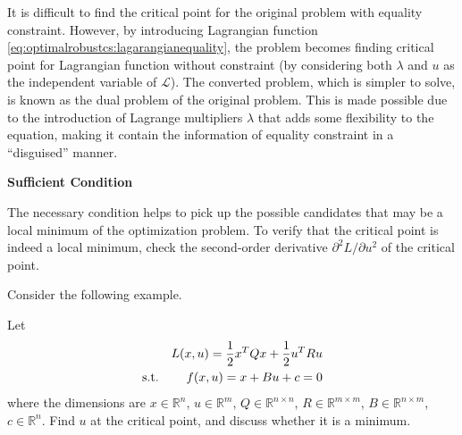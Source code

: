 It is difficult to find the critical point for the original problem with equality constraint. However, by introducing Lagrangian function \eqref{eq:optimalrobustcs:lagarangianequality}, the problem becomes finding critical point for Lagrangian function without constraint (by considering both $\lambda$ and $u$ as the independent variable of $\mathcal{L}$). The converted problem, which is simpler to solve, is known as the dual problem of the original problem. This is made possible due to the introduction of Lagrange multipliers $\lambda$ that adds some flexibility to the equation, making it contain the information of equality constraint in a ``disguised'' manner.

\vspace{0.1in}
\noindent \textbf{Sufficient Condition}
\vspace{0.1in}

The necessary condition helps to pick up the possible candidates that may be a local minimum of the optimization problem. To verify that the critical point is indeed a local minimum, check the second-order derivative $\partial^2 L / \partial u^2$ of the critical point.

Consider the following example.
\begin{shortbox}

Let
\begin{eqnarray}
	&& L(x, u) = \dfrac{1}{2}x^TQx + \dfrac{1}{2}u^TRu \label{eq:optimalrobustcs:quadraticsurfexp1} \\
	\textup{s.t.} && f(x, u) = x + Bu + c = 0 \nonumber
\end{eqnarray}
where the dimensions are $x\in\mathbb{R}^n$, $u\in\mathbb{R}^m$, $Q\in\mathbb{R}^{n\times n}$, $R\in\mathbb{R}^{m\times m}$, $B\in\mathbb{R}^{n\times m}$, $c\in\mathbb{R}^n$. Find $u$ at the critical point, and discuss whether it is a minimum.

\end{shortbox}

